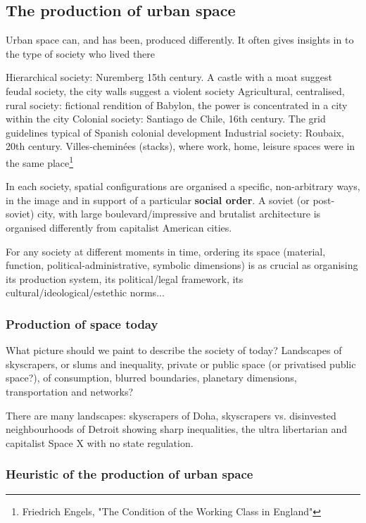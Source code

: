 \documentclass{article}
\begin{document}
\subsection{The production of urban space}

Urban space can, and has been, produced differently. It often gives insights in to the type of society who lived there

\begin{outline}
	\1 Hierarchical society: Nuremberg 15th century. A castle with a moat suggest feudal society, the city walls suggest a violent society
	\1 Agricultural, centralised, rural society: fictional rendition of Babylon, the power is concentrated in a city within the city
	\1 Colonial society: Santiago de Chile, 16th century. The grid guidelines typical of Spanish colonial development
	\1 Industrial society: Roubaix, 20th century. Villes-cheminées (stacks), where work, home, leisure spaces were in the same place\footnote{Friedrich Engels, "The Condition of the Working Class in England"}
\end{outline}

In each society, spatial configurations are organised a specific, non-arbitrary ways, in the image and in support of a particular \textbf{social order}. A soviet (or post-soviet) city, with large boulevard/impressive and brutalist architecture is organised differently from capitalist American cities.

For any society at different moments in time, ordering its space (material, function, political-administrative, symbolic dimensions) is as crucial as organising its production system, its political/legal framework, its cultural/ideological/estethic norms...

\subsubsection{Production of space today}

What picture should we paint to describe the society of today? Landscapes of skyscrapers, or slums and inequality, private or public space (or privatised public space?), of consumption, blurred boundaries, planetary dimensions, transportation and networks?

There are many landscapes: skyscrapers of Doha, skyscrapers vs. disinvested neighbourhoods of Detroit showing sharp inequalities, the ultra libertarian and capitalist Space X with no state regulation.

\subsubsection{Heuristic of the production of urban space}
\end{document}
